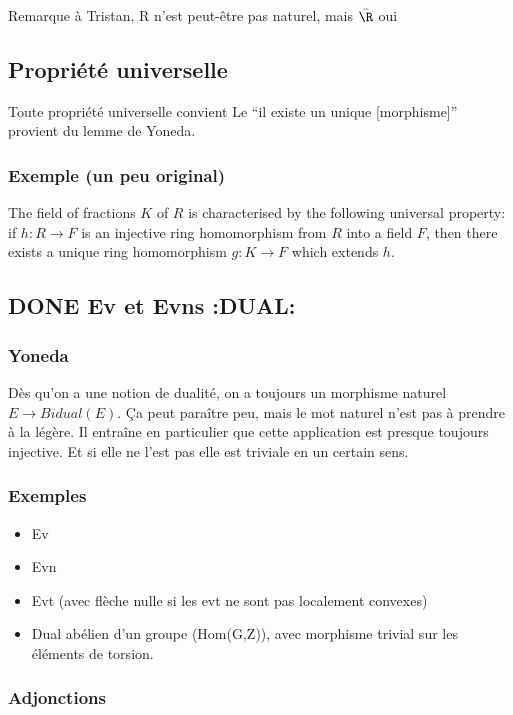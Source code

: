 \documentclass[11pt]{article}
\begin{document}
Remarque à Tristan, R n’est peut-être pas naturel, mais $\bar\R$ oui
\subsection{Propriété universelle}
\label{sec-1-4}

Toute propriété universelle convient
Le ``il existe un unique [morphisme]'' provient du lemme de Yoneda.
\subsubsection{Exemple (un peu original)}
\label{sec-1-4-1}

The field of fractions $K$ of $R$ is characterised by the following universal property: if $h:R\rightarrow F$ is an injective ring homomorphism from $R$ into a field $F$, then there exists a unique ring homomorphism $g:K\rightarrow F$ which extends $h$.
\subsection{\textbf{DONE} Ev et Evns \textbf{:DUAL:}}
\label{sec-1-5}
\subsubsection{Yoneda}
\label{sec-1-5-1}

Dès qu'on a une notion de dualité, on a toujours un morphisme naturel $E \to Bidual(E)$. Ça peut paraître peu, mais le mot naturel n'est pas à prendre à la légère. Il entraîne en particulier que cette application est presque toujours injective. Et si elle ne l'est pas elle est triviale en un certain sens.
\subsubsection{Exemples}
\label{sec-1-5-2}

\begin{itemize}
\item Ev
\item Evn
\item Evt (avec flèche nulle si les evt ne sont pas localement convexes)
\item Dual abélien d'un groupe (Hom(G,Z)), avec morphisme trivial sur les éléments de torsion.
\end{itemize}
\subsubsection{Adjonctions}
\label{sec-1-5-3}
\end{document}

